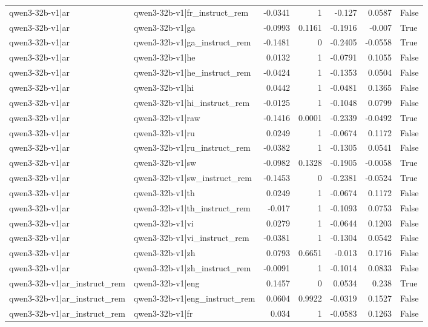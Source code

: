 \begin{table}
\begin{tabular}{l l r r r r l}
qwen3-32b-v1|ar & qwen3-32b-v1|fr_instruct_rem & -0.0341 & 1 & -0.127 & 0.0587 & False \\
qwen3-32b-v1|ar & qwen3-32b-v1|ga & -0.0993 & 0.1161 & -0.1916 & -0.007 & True \\
qwen3-32b-v1|ar & qwen3-32b-v1|ga_instruct_rem & -0.1481 & 0 & -0.2405 & -0.0558 & True \\
qwen3-32b-v1|ar & qwen3-32b-v1|he & 0.0132 & 1 & -0.0791 & 0.1055 & False \\
qwen3-32b-v1|ar & qwen3-32b-v1|he_instruct_rem & -0.0424 & 1 & -0.1353 & 0.0504 & False \\
qwen3-32b-v1|ar & qwen3-32b-v1|hi & 0.0442 & 1 & -0.0481 & 0.1365 & False \\
qwen3-32b-v1|ar & qwen3-32b-v1|hi_instruct_rem & -0.0125 & 1 & -0.1048 & 0.0799 & False \\
qwen3-32b-v1|ar & qwen3-32b-v1|raw & -0.1416 & 0.0001 & -0.2339 & -0.0492 & True \\
qwen3-32b-v1|ar & qwen3-32b-v1|ru & 0.0249 & 1 & -0.0674 & 0.1172 & False \\
qwen3-32b-v1|ar & qwen3-32b-v1|ru_instruct_rem & -0.0382 & 1 & -0.1305 & 0.0541 & False \\
qwen3-32b-v1|ar & qwen3-32b-v1|sw & -0.0982 & 0.1328 & -0.1905 & -0.0058 & True \\
qwen3-32b-v1|ar & qwen3-32b-v1|sw_instruct_rem & -0.1453 & 0 & -0.2381 & -0.0524 & True \\
qwen3-32b-v1|ar & qwen3-32b-v1|th & 0.0249 & 1 & -0.0674 & 0.1172 & False \\
qwen3-32b-v1|ar & qwen3-32b-v1|th_instruct_rem & -0.017 & 1 & -0.1093 & 0.0753 & False \\
qwen3-32b-v1|ar & qwen3-32b-v1|vi & 0.0279 & 1 & -0.0644 & 0.1203 & False \\
qwen3-32b-v1|ar & qwen3-32b-v1|vi_instruct_rem & -0.0381 & 1 & -0.1304 & 0.0542 & False \\
qwen3-32b-v1|ar & qwen3-32b-v1|zh & 0.0793 & 0.6651 & -0.013 & 0.1716 & False \\
qwen3-32b-v1|ar & qwen3-32b-v1|zh_instruct_rem & -0.0091 & 1 & -0.1014 & 0.0833 & False \\
qwen3-32b-v1|ar_instruct_rem & qwen3-32b-v1|eng & 0.1457 & 0 & 0.0534 & 0.238 & True \\
qwen3-32b-v1|ar_instruct_rem & qwen3-32b-v1|eng_instruct_rem & 0.0604 & 0.9922 & -0.0319 & 0.1527 & False \\
qwen3-32b-v1|ar_instruct_rem & qwen3-32b-v1|fr & 0.034 & 1 & -0.0583 & 0.1263 & False \\

\end{tabular}
\end{table}
